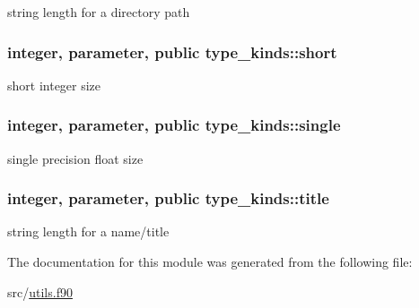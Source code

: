 string length for a directory path 

\hypertarget{classtype__kinds_ab4d7bfce672e6152e78f87f8aa5b2e04}{
\subsubsection[{short}]{\setlength{\rightskip}{0pt plus 5cm}integer, parameter, public type\-\_\-kinds\-::short}}\label{classtype__kinds_ab4d7bfce672e6152e78f87f8aa5b2e04}


short integer size 

\hypertarget{classtype__kinds_a1752925d569776fd4a88872a620ed1d0}{
\subsubsection[{single}]{\setlength{\rightskip}{0pt plus 5cm}integer, parameter, public type\-\_\-kinds\-::single}}\label{classtype__kinds_a1752925d569776fd4a88872a620ed1d0}


single precision float size 

\hypertarget{classtype__kinds_aa2f577aea616d9b9bb91ce438bdf3c02}{
\subsubsection[{title}]{\setlength{\rightskip}{0pt plus 5cm}integer, parameter, public type\-\_\-kinds\-::title}}\label{classtype__kinds_aa2f577aea616d9b9bb91ce438bdf3c02}


string length for a name/title 



The documentation for this module was generated from the following file\-:\begin{DoxyCompactItemize}
\item 
src/\hyperlink{utils_8f90}{utils.\-f90}\end{DoxyCompactItemize}

